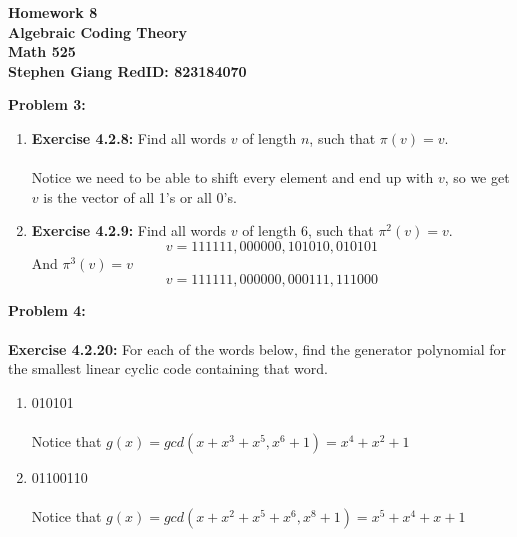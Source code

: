 \documentclass[11pt]{article}
\newcommand{\skipline}{\vspace{\baselineskip}}
\newenvironment{problem}[1]{\textbf{Problem #1: }}{\newpage}
\begin{document}
	
	\begin{center}
		\textbf{Homework 8} \\
		\textbf{Algebraic Coding Theory} \\
		\textbf{Math 525} \\
		\textbf{Stephen Giang RedID: 823184070} \\
		\skipline \skipline
	\end{center}

	\begin{problem}{3}
		\begin{enumerate}[label = (\alph*)]
			\item \textbf{Exercise 4.2.8: } Find all words $v$ of length $n$, such that $\pi(v) = v$.  
			\\ \\
			Notice we need to be able to shift every element and end up with $v$, so we get $v$ is the vector of all 1's or all 0's.
			\item \textbf{Exercise 4.2.9: } Find all words $v$ of length 6, such that $\pi^2(v) = v$.
			\[v = 111111, 000000, 101010, 010101\]
			And $\pi^3(v) = v$
			\[v = 111111, 000000, 000111, 111000\]
		\end{enumerate}
	\end{problem}

	\begin{problem}{4}
		\\ \\
		\textbf{Exercise 4.2.20: } For each of the words below, find the generator polynomial for the smallest linear cyclic code containing that word.
		\begin{enumerate}[label = (\alph*)]
			\item 010101
			\\ \\
			Notice that $g(x) = gcd(x + x^3 + x^5, x^6 + 1) = x^4 + x^2 + 1$
			\item 01100110
			\\ \\
			Notice that $g(x) = gcd(x + x^2 + x^5 + x^6, x^8 + 1) = x^5 + x^4 + x + 1$
		\end{enumerate}
	\end{problem}
\end{document}
